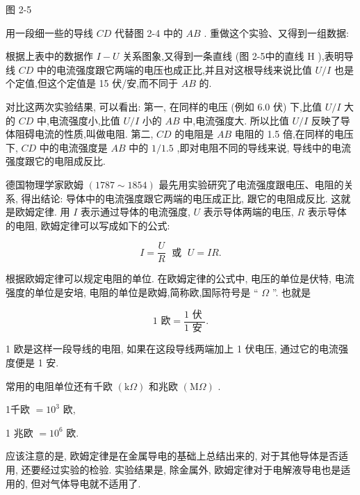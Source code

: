 \documentclass[10pt]{article}
\begin{document}
图 2-5

用一段细一些的导线 \({CD}\) 代替图 2-4 中的 \({AB}\) . 重做这个实验、又得到一组数据:

\begin{center}
\end{center}

根据上表中的数据作 \(I - U\) 关系图象,又得到一条直线 (图 2-5中的直线 \(\mathrm{H}\) ),表明导线 \({CD}\) 中的电流强度跟它两端的电压也成正比,并且对这根导线来说比值 \(U/I\) 也是个定值,但这个定值是 15 伏/安,而不同于 \({AB}\) 的.

对比这两次实验结果, 可以看出: 第一, 在同样的电压 (例如 6.0 伏) 下,比值 \(U/I\) 大的 \({CD}\) 中,电流强度小,比值 \(U/I\) 小的 \({AB}\) 中,电流强度大. 所以比值 \(U/I\) 反映了导体阻碍电流的性质,叫做电阻. 第二, \({CD}\) 的电阻是 \({AB}\) 电阻的 1.5 倍,在同样的电压下, \({CD}\) 中的电流强度是 \({AB}\) 中的 \(1/{1.5}\) ,即对电阻不同的导线来说, 导线中的电流强度跟它的电阻成反比.

德国物理学家欧姆 \(\left( {{1787} \sim {1854}}\right)\) 最先用实验研究了电流强度跟电压、电阻的关系, 得出结论: 导体中的电流强度跟它两端的电压成正比, 跟它的电阻成反比. 这就是欧姆定律. 用 \(I\) 表示通过导体的电流强度, \(U\) 表示导体两端的电压, \(R\) 表示导体的电阻, 欧姆定律可以写成如下的公式:

\[
I = \frac{U}{R}\;\text{ 或 }\;U = {IR}.
\]

根据欧姆定律可以规定电阻的单位. 在欧姆定律的公式中, 电压的单位是伏特, 电流强度的单位是安培, 电阻的单位是欧姆,简称欧,国际符号是 “ \(\Omega\) ”. 也就是

\[
\text{1 欧} = \frac{1\text{ 伏 }}{1\text{ 安 }}\text{.}
\]

1 欧是这样一段导线的电阻, 如果在这段导线两端加上 1 伏电压, 通过它的电流强度便是 1 安.

常用的电阻单位还有千欧 \(\left( {\mathrm{k}\Omega }\right)\) 和兆欧 \(\left( {\mathrm{M}\Omega }\right)\) .

1千欧 \(= {10}^{3}\) 欧,

1 兆欧 \(= {10}^{6}\) 欧.

应该注意的是, 欧姆定律是在金属导电的基础上总结出来的, 对于其他导体是否适用, 还要经过实验的检验. 实验结果是, 除金属外, 欧姆定律对于电解液导电也是适用的, 但对气体导电就不适用了.
\end{document}
